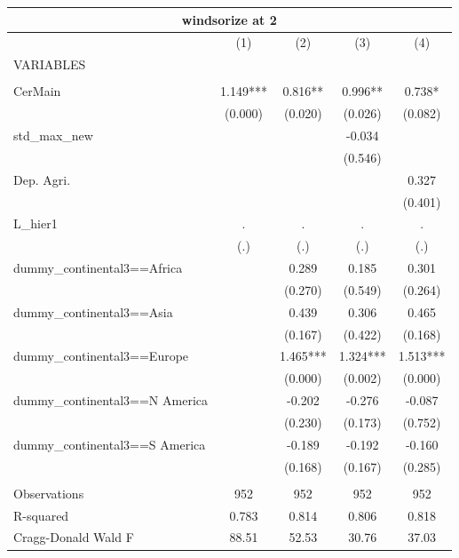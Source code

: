 \documentclass[12pt,a4paper]{article}
\begin{document}
\begin{tabular}{lcccc}
\multicolumn{5}{c}{windsorize at 2} \\ \hline
 & (1) & (2) & (3) & (4) \\
VARIABLES &  &  &  &  \\ \hline
 &  &  &  &  \\
CerMain & 1.149*** & 0.816** & 0.996** & 0.738* \\
 & (0.000) & (0.020) & (0.026) & (0.082) \\
std\_max\_new &  &  & -0.034 &  \\
 &  &  & (0.546) &  \\
Dep. Agri. &  &  &  & 0.327 \\
 &  &  &  & (0.401) \\
L\_hier1 & . & . & . & . \\
 & (.) & (.) & (.) & (.) \\
dummy\_continental3==Africa &  & 0.289 & 0.185 & 0.301 \\
 &  & (0.270) & (0.549) & (0.264) \\
dummy\_continental3==Asia &  & 0.439 & 0.306 & 0.465 \\
 &  & (0.167) & (0.422) & (0.168) \\
dummy\_continental3==Europe &  & 1.465*** & 1.324*** & 1.513*** \\
 &  & (0.000) & (0.002) & (0.000) \\
dummy\_continental3==N America &  & -0.202 & -0.276 & -0.087 \\
 &  & (0.230) & (0.173) & (0.752) \\
dummy\_continental3==S America &  & -0.189 & -0.192 & -0.160 \\
 &  & (0.168) & (0.167) & (0.285) \\
 &  &  &  &  \\
Observations & 952 & 952 & 952 & 952 \\
R-squared & 0.783 & 0.814 & 0.806 & 0.818 \\
 Cragg-Donald Wald F & 88.51 & 52.53 & 30.76 & 37.03 \\ \hline
\end{tabular}
\end{document}
